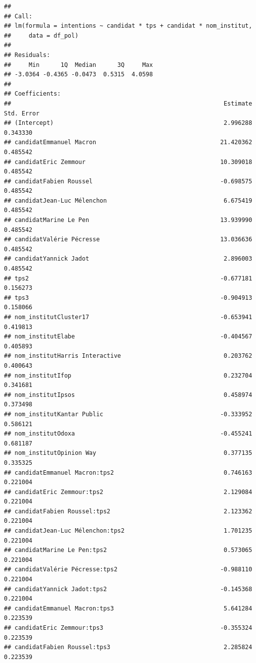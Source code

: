 \documentclass[
]{book}
\begin{document}
\begin{verbatim}
## 
## Call:
## lm(formula = intentions ~ candidat * tps + candidat * nom_institut, 
##     data = df_pol)
## 
## Residuals:
##     Min      1Q  Median      3Q     Max 
## -3.0364 -0.4365 -0.0473  0.5315  4.0598 
## 
## Coefficients:
##                                                            Estimate Std. Error
## (Intercept)                                                2.996288   0.343330
## candidatEmmanuel Macron                                   21.420362   0.485542
## candidatEric Zemmour                                      10.309018   0.485542
## candidatFabien Roussel                                    -0.698575   0.485542
## candidatJean-Luc Mélenchon                                 6.675419   0.485542
## candidatMarine Le Pen                                     13.939990   0.485542
## candidatValérie Pécresse                                  13.036636   0.485542
## candidatYannick Jadot                                      2.896003   0.485542
## tps2                                                      -0.677181   0.156273
## tps3                                                      -0.904913   0.158066
## nom_institutCluster17                                     -0.653941   0.419813
## nom_institutElabe                                         -0.404567   0.405893
## nom_institutHarris Interactive                             0.203762   0.400643
## nom_institutIfop                                           0.232704   0.341681
## nom_institutIpsos                                          0.458974   0.373498
## nom_institutKantar Public                                 -0.333952   0.586121
## nom_institutOdoxa                                         -0.455241   0.681187
## nom_institutOpinion Way                                    0.377135   0.335325
## candidatEmmanuel Macron:tps2                               0.746163   0.221004
## candidatEric Zemmour:tps2                                  2.129084   0.221004
## candidatFabien Roussel:tps2                                2.123362   0.221004
## candidatJean-Luc Mélenchon:tps2                            1.701235   0.221004
## candidatMarine Le Pen:tps2                                 0.573065   0.221004
## candidatValérie Pécresse:tps2                             -0.988110   0.221004
## candidatYannick Jadot:tps2                                -0.145368   0.221004
## candidatEmmanuel Macron:tps3                               5.641284   0.223539
## candidatEric Zemmour:tps3                                 -0.355324   0.223539
## candidatFabien Roussel:tps3                                2.285824   0.223539

\end{verbatim}
\end{document}
